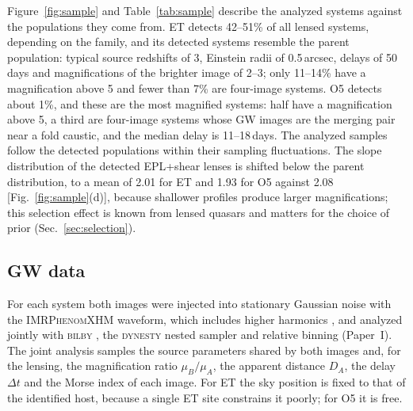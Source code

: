 Figure~\ref{fig:sample} and Table~\ref{tab:sample} describe the analyzed systems against the populations they come from. ET detects 42--51\% of all lensed systems, depending on the family, and its detected systems resemble the parent population: typical source redshifts of 3, Einstein radii of 0.5\,arcsec, delays of 50\,days and magnifications of the brighter image of 2--3; only 11--14\% have a magnification above 5 and fewer than 7\% are four-image systems. O5 detects about 1\%, and these are the most magnified systems: half have a magnification above 5, a third are four-image systems whose GW images are the merging pair near a fold caustic, and the median delay is 11--18\,days. The analyzed samples follow the detected populations within their sampling fluctuations. The slope distribution of the detected EPL+shear lenses is shifted below the parent distribution, to a mean of 2.01 for ET and 1.93 for O5 against 2.08 [Fig.~\ref{fig:sample}(d)], because shallower profiles produce larger magnifications; this selection effect is known from lensed quasars \citep{collett2016selection,li2024selection} and matters for the choice of prior (Sec.~\ref{sec:selection}).

\begin{table}
\caption{The analyzed systems: median and 10--90\% range of the true quantities, and numbers of systems. Image $A$ is the GW image with the larger measured SNR.}
\label{tab:sample}
\footnotesize

\end{table}

\subsection{GW data}
\label{sec:gwdata}
For each system both images were injected into stationary Gaussian noise with the \textsc{IMRPhenomXHM} waveform, which includes higher harmonics \citep{garciaquiros2020xhm}, and analyzed jointly with \textsc{bilby} \citep{ashton2019bilby}, the \textsc{dynesty} nested sampler \citep{speagle2020dynesty} and relative binning \citep{zackay2018relbin,krishna2023relbin} (Paper~I). The joint analysis samples the source parameters shared by both images and, for the lensing, the magnification ratio $\mu_B/\mu_A$, the apparent distance $D_A$, the delay $\Delta t$ and the Morse index of each image. For ET the sky position is fixed to that of the identified host, because a single ET site constrains it poorly; for O5 it is free.


